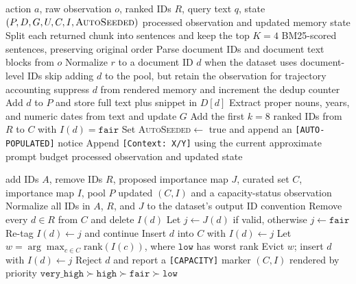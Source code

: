 \documentclass{article}
\begin{document}
\begin{algorithm}[t]
\caption{Observation processing and working-memory update.}
\label{alg:obs}
\small
\begin{algorithmic}[1]
\REQUIRE action $a$, raw observation $o$, ranked IDs $R$, query text $q$, state $(P,D,G,U,C,I,\textsc{AutoSeeded})$
\ENSURE processed observation and updated memory state
  \STATE Split each returned chunk into sentences and keep the top $K{=}4$ BM25-scored sentences, preserving original order
\ENDIF
\STATE Parse document IDs and document text blocks from $o$
  \STATE Normalize $r$ to a document ID $d$ when the dataset uses document-level IDs
    \STATE skip adding $d$ to the pool, but retain the observation for trajectory accounting
    \STATE suppress $d$ from rendered memory and increment the dedup counter
  \ELSE
    \STATE Add $d$ to $P$ and store full text plus snippet in $D[d]$
    \STATE Extract proper nouns, years, and numeric dates from $\mathrm{text}$ and update $G$
  \ENDIF
\ENDFOR
{}
  \STATE Add the first $k{=}8$ ranked IDs from $R$ to $C$ with $I(d)=\texttt{fair}$
  \STATE Set \textsc{AutoSeeded}$\leftarrow$ true and append an \texttt{[AUTO-POPULATED]} notice
\ENDIF
{}
  \STATE Append \texttt{[Context: X/Y]} using the current approximate prompt budget
\ENDIF
\RETURN processed observation and updated state
\end{algorithmic}
\end{algorithm}

\begin{algorithm}[t]
\caption{Importance-aware curation and capacity management.}
\label{alg:curate}
\small
\begin{algorithmic}[1]
\REQUIRE add IDs $A$, remove IDs $R$, proposed importance map $J$, curated set $C$, importance map $I$, pool $P$
\ENSURE updated $(C,I)$ and a capacity-status observation
\STATE Normalize all IDs in $A$, $R$, and $J$ to the dataset's output ID convention
\STATE Remove every $d\in R$ from $C$ and delete $I(d)$
  \STATE Let $j\leftarrow J(d)$ if valid, otherwise $j\leftarrow\texttt{fair}$
    \STATE Re-tag $I(d)\leftarrow j$ and continue
  \ENDIF
    \STATE Insert $d$ into $C$ with $I(d)\leftarrow j$
  \ELSE
    \STATE Let $w=\arg\max_{c\in C}\mathrm{rank}(I(c))$, where $\texttt{low}$ has worst rank
      \STATE Evict $w$; insert $d$ with $I(d)\leftarrow j$
    \ELSE
      \STATE Reject $d$ and report a \texttt{[CAPACITY]} marker
    \ENDIF
  \ENDIF
\ENDFOR
\RETURN $(C,I)$ rendered by priority $\texttt{very\_high}\succ\texttt{high}\succ\texttt{fair}\succ\texttt{low}$
\end{algorithmic}
\end{algorithm}
\end{document}
